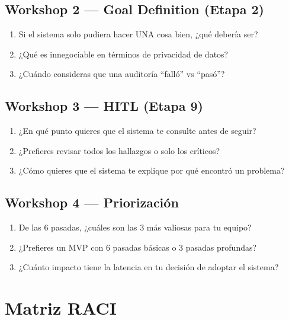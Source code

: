 \documentclass[12pt,a4paper]{article}
\begin{document}
\subsection{Workshop 2 --- Goal Definition (Etapa 2)}
\begin{enumerate}
  \item Si el sistema solo pudiera hacer UNA cosa bien, ¿qué debería ser?
  \item ¿Qué es innegociable en términos de privacidad de datos?
  \item ¿Cuándo consideras que una auditoría ``falló'' vs ``pasó''?
\end{enumerate}

\subsection{Workshop 3 --- HITL (Etapa 9)}
\begin{enumerate}
  \item ¿En qué punto quieres que el sistema te consulte antes de seguir?
  \item ¿Prefieres revisar todos los hallazgos o solo los críticos?
  \item ¿Cómo quieres que el sistema te explique por qué encontró un problema?
\end{enumerate}

\subsection{Workshop 4 --- Priorización}
\begin{enumerate}
  \item De las 6 pasadas, ¿cuáles son las 3 más valiosas para tu equipo?
  \item ¿Prefieres un MVP con 6 pasadas básicas o 3 pasadas profundas?
  \item ¿Cuánto impacto tiene la latencia en tu decisión de adoptar el sistema?
\end{enumerate}

\section{Matriz RACI}
\end{document}
